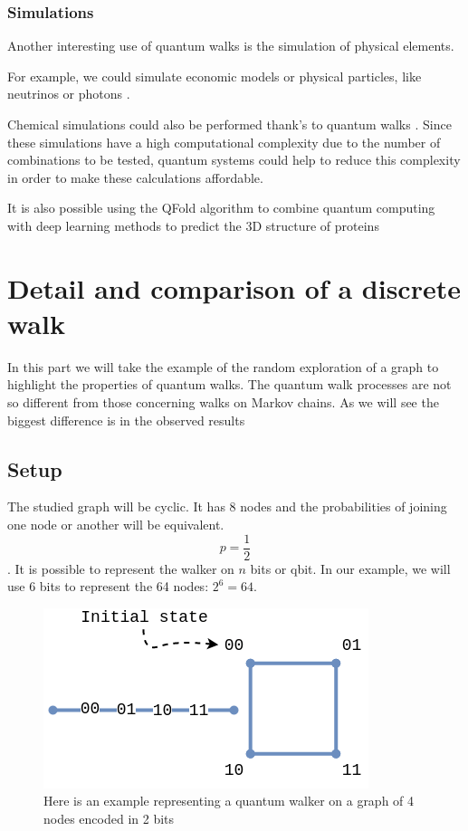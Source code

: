 \documentclass[9pt,journal,compsoc]{IEEEtran}
\begin{document}
        \subsubsection{Simulations}
            Another interesting use of quantum walks is the simulation of physical elements.
                
            For example, we could simulate economic models \cite{orrell2021quantum}
            or physical particles, like neutrinos \cite{di2016quantum} or photons \cite{aspuru2012photonic}.

            Chemical simulations could also be performed thank's to quantum walks \cite{kassal2011simulating}.
            Since these simulations have a high computational complexity due to the number of combinations to be tested, quantum systems could help to reduce this complexity in order to make these calculations affordable.

            It is also possible using the QFold algorithm to combine quantum computing with deep learning methods to predict the 3D structure of proteins  \cite{casares2022qfold}

    
    \section{Detail and comparison of a discrete walk}
        In this part we will take the example of the random exploration of a graph to highlight the properties of quantum walks.
        The quantum walk processes are not so different from those concerning walks on Markov chains. As we will see the biggest difference is in the observed results
        
        \subsection{Setup}
            The studied graph will be cyclic. It has 8 nodes and the probabilities of joining one node or another will be equivalent.
            $$p = \frac{1}{2}$$.
            It is possible to represent the walker on $n$ bits or qbit.
            In our example, we will use 6 bits to represent the 64 nodes: $2^6=64$.
            \begin{figure}[htp!]
                \centering
                \includegraphics[scale=0.4]{assets/img/schema1-bis.png}
                \caption{Here is an example representing a quantum walker on a graph of 4 nodes encoded in 2 bits}
                \label{fig:encoding}
            \end{figure}
            
\end{document}
